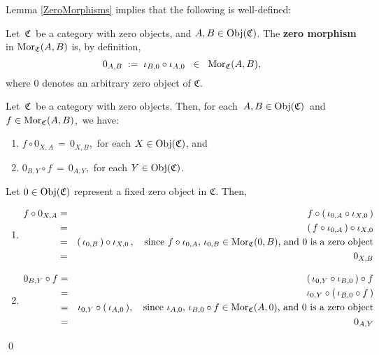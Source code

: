 \vskip 0.5cm
\noindent
Lemma \ref{ZeroMorphisms} implies that the following is well-defined:


\vskip 0.5cm
\begin{definition}
\mbox{}
\vskip 0.15cm
\noindent
Let \,$\mathfrak{C}$\, be a category with zero objects, and $A, B \in \textnormal{Obj}(\mathfrak{C})$.
The \textbf{zero morphism} in $\textnormal{Mor}_{\mathfrak{C}}(A,B)$ is, by definition,
\begin{equation*}
0_{A,B}
\; := \;
	\iota_{B,0} \circ \iota_{A,0}
\;\; \in \;\;
	\textnormal{Mor}_{\mathfrak{C}}(A,B),
\end{equation*}
where $0$ denotes an arbitrary zero object of $\mathfrak{C}$.
\end{definition}


\vskip 0.5cm
\begin{lemma}
\mbox{}
\vskip 0.15cm
\noindent
Let \,$\mathfrak{C}$\, be a category with zero objects.
Then, for each \,$A, B \in \textnormal{Obj}(\mathfrak{C})$\, and \,$f \in \textnormal{Mor}_{\mathfrak{C}}(A,B)$,\, we have:
\begin{enumerate}
\item
	$f \circ 0_{X,A} \,=\, 0_{X,B}$,\, for each $X \in \textnormal{Obj}(\mathfrak{C})$, and
\item
	$0_{B,Y} \circ f \,=\, 0_{A,Y}$,\, for each $Y \in \textnormal{Obj}(\mathfrak{C})$.
\end{enumerate}
\end{lemma}
\proof
Let $0 \in \textnormal{Obj}(\mathfrak{C})$ represent a fixed zero object in $\mathfrak{C}$.
Then,
\begin{enumerate}
\item
	\begin{eqnarray*}
	f \circ 0_{X,A}
	& = &
		f \circ (\,\iota_{0,A} \circ \iota_{X,0}\,)
	\\
	& = &
		(\,f \circ \iota_{0,A}\,) \circ \iota_{X,0}
	\\
	& = &
		(\,\iota_{0,B}\,) \circ \iota_{X,0}\,,
		\quad
		\textnormal{since $f \circ \iota_{0,A},\, \iota_{0,B} \in \textnormal{Mor}_{\mathfrak{C}}(0,B)$, and $0$ is a zero object}
	\\
	& = &
		0_{X,B}
	\end{eqnarray*}
\item
	\begin{eqnarray*}
	0_{B,Y} \circ f
	& = &
		(\,\iota_{0,Y} \circ \iota_{B,0}\,) \circ f
	\\
	& = &
		\iota_{0,Y} \circ (\,\iota_{B,0} \circ f\,)
	\\
	& = &
		\iota_{0,Y} \circ (\,\iota_{A,0}\,),
		\quad
		\textnormal{since $\iota_{A,0},\, \iota_{B,0} \circ f \in \textnormal{Mor}_{\mathfrak{C}}(A,0)$, and $0$ is a zero object}
	\\
	& = &
		0_{A,Y}
	\end{eqnarray*}
\end{enumerate}
\qed

